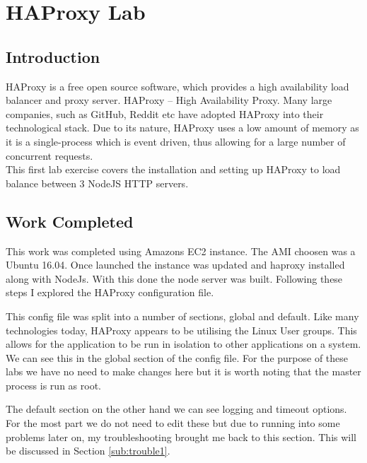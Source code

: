 \section{HAProxy Lab}
\subsection{Introduction}
HAProxy is a free open source software, which provides a high availability load balancer and proxy server. HAProxy -- High Availability Proxy. Many large companies, such as GitHub, Reddit etc have adopted HAProxy into their technological stack. Due to its nature, HAProxy uses a low amount of memory as it is a single-process which is event driven, thus allowing for a large number of concurrent requests.
\\This first lab exercise covers the installation and setting up HAProxy to load balance between 3 NodeJS HTTP servers.

\subsection{Work Completed}
This work was completed using Amazons EC2 instance. The AMI choosen was a Ubuntu 16.04. Once launched the instance was updated and haproxy installed along with NodeJs. With this done the node server was built. Following these steps I explored the HAProxy configuration file.

This config file was split into a number of sections, global and default. Like many technologies today, HAProxy appears to be utilising the Linux User groups. This allows for the application to be run in isolation to other applications on a system. We can see this in the global section of the config file. For the purpose of these labs we have no need to make changes here but it is worth noting that the master process is run as root.

The default section on the other hand we can see logging and timeout options. For the most part we do not need to edit these but due to running into some problems later on, my troubleshooting brought me back to this section. This will be discussed in Section \ref{sub:trouble1}.

